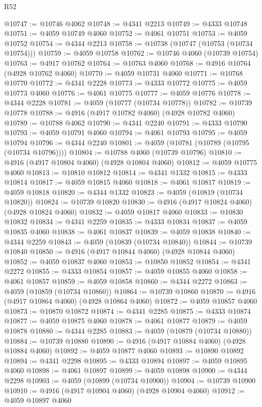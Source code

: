 \begin{lexlean}{R52}
\begin{coremodule}
@10747 := @10746 @4062
@10748 := @4341 @2213
@10749 := @4333 @10748
@10751 := @4059 @10749 @4060
@10752 := @4061 @10751
@10753 := @4059 @10752
@10754 := @4344 @2213
@10758 := @10738 (@10747 (@10753 (@10734 @10754)))
@10759 := @4059 @10758
@10762 := @10746 @4060 (@10739 @10754)
@10763 := @4917 @10762
@10764 := @10763 @4060
@10768 := @4916 @10764 (@4928 @10762 @4060)
@10770 := @4059 @10731 @4060
@10771 := @10768 @10770
@10772 := @4341 @2228
@10773 := @4333 @10772
@10775 := @4059 @10773 @4060
@10776 := @4061 @10775
@10777 := @4059 @10776
@10778 := @4344 @2228
@10781 := @4059 (@10777 (@10734 @10778))
@10782 := @10739 @10778
@10788 := @4916 (@4917 @10782 @4060) (@4928 @10782 @4060)
@10789 := @10788 @4062
@10790 := @4341 @2240
@10791 := @4333 @10790
@10793 := @4059 @10791 @4060
@10794 := @4061 @10793
@10795 := @4059 @10794
@10796 := @4344 @2240
@10801 := @4059 (@10781 (@10789 (@10795 (@10734 @10796))))
@10804 := @10788 @4060 (@10739 @10796)
@10810 := @4916 (@4917 @10804 @4060) (@4928 @10804 @4060)
@10812 := @4059 @10775 @4060
@10813 := @10810 @10812
@10814 := @4341 @1332
@10815 := @4333 @10814
@10817 := @4059 @10815 @4060
@10818 := @4061 @10817
@10819 := @4059 @10818
@10820 := @4344 @1332
@10823 := @4059 (@10819 (@10734 @10820))
@10824 := @10739 @10820
@10830 := @4916 (@4917 @10824 @4060) (@4928 @10824 @4060)
@10832 := @4059 @10817 @4060
@10833 := @10830 @10832
@10834 := @4341 @2259
@10835 := @4333 @10834
@10837 := @4059 @10835 @4060
@10838 := @4061 @10837
@10839 := @4059 @10838
@10840 := @4344 @2259
@10843 := @4059 (@10839 (@10734 @10840))
@10844 := @10739 @10840
@10850 := @4916 (@4917 @10844 @4060) (@4928 @10844 @4060)
@10852 := @4059 @10837 @4060
@10853 := @10850 @10852
@10854 := @4341 @2272
@10855 := @4333 @10854
@10857 := @4059 @10855 @4060
@10858 := @4061 @10857
@10859 := @4059 @10858
@10860 := @4344 @2272
@10863 := @4059 (@10859 (@10734 @10860))
@10864 := @10739 @10860
@10870 := @4916 (@4917 @10864 @4060) (@4928 @10864 @4060)
@10872 := @4059 @10857 @4060
@10873 := @10870 @10872
@10874 := @4341 @2285
@10875 := @4333 @10874
@10877 := @4059 @10875 @4060
@10878 := @4061 @10877
@10879 := @4059 @10878
@10880 := @4344 @2285
@10883 := @4059 (@10879 (@10734 @10880))
@10884 := @10739 @10880
@10890 := @4916 (@4917 @10884 @4060) (@4928 @10884 @4060)
@10892 := @4059 @10877 @4060
@10893 := @10890 @10892
@10894 := @4341 @2298
@10895 := @4333 @10894
@10897 := @4059 @10895 @4060
@10898 := @4061 @10897
@10899 := @4059 @10898
@10900 := @4344 @2298
@10903 := @4059 (@10899 (@10734 @10900))
@10904 := @10739 @10900
@10910 := @4916 (@4917 @10904 @4060) (@4928 @10904 @4060)
@10912 := @4059 @10897 @4060

\end{coremodule}
\end{lexlean}
